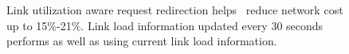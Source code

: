 {\begin{figure}[t]
\begin{center}
\end{center}
\caption{Link utilization aware request redirection helps \invlru\ reduce network cost up to 15\%-21\%. Link load information updated every 30 seconds performs as well as using current link load information.}
\label{fig:lrusnmp}
\end{figure}
}


%
%
%
%
%
%

